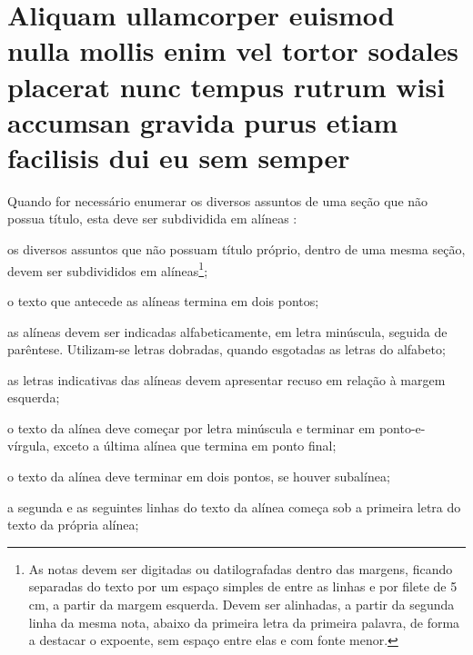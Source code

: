\documentclass[12pt,openright,twoside,a4paper]{abntex2}
\begin{document}

\section{Aliquam ullamcorper euismod nulla mollis enim vel tortor sodales placerat nunc
tempus rutrum wisi accumsan gravida purus etiam facilisis dui eu sem semper}

Quando for necessário enumerar os diversos assuntos de uma seção que não possua
título, esta deve ser subdividida em alíneas \cite[4.2]{NBR6024:2012}:

\begin{alineas}

  \item os diversos assuntos que não possuam título próprio, dentro de uma mesma
  seção, devem ser subdivididos em alíneas\footnote{As notas devem ser digitadas ou datilografadas
  dentro das margens, ficando separadas do texto por um espaço simples de entre as
  linhas e por filete de 5 cm, a partir da margem esquerda. Devem ser
  alinhadas, a partir da segunda linha da mesma nota, abaixo da primeira letra
  da primeira palavra, de forma a destacar o expoente, sem espaço entre elas e
  com fonte menor. }; 
  
  \item o texto que antecede as alíneas termina em dois pontos;
  \item as alíneas devem ser indicadas alfabeticamente, em letra minúscula,
  seguida de parêntese. Utilizam-se letras dobradas, quando esgotadas as
  letras do alfabeto;

  \item as letras indicativas das alíneas devem apresentar recuso em relação à
  margem esquerda;

  \item o texto da alínea deve começar por letra minúscula e terminar em
  ponto-e-vírgula, exceto a última alínea que termina em ponto final;

  \item o texto da alínea deve terminar em dois pontos, se houver subalínea;

  \item a segunda e as seguintes linhas do texto da alínea começa sob a
  primeira letra do texto da própria alínea;
  

\end{alineas}
\end{document}
